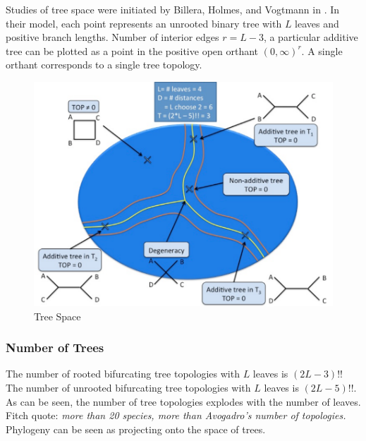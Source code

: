 Studies of tree space were initiated by Billera, Holmes, and Vogtmann in \cite{Billera:2001tv}.
In their model, each point represents an unrooted binary tree with $L$ leaves and positive branch lengths.
Number of interior edges $r=L-3$, a particular additive tree can be plotted as a point in the positive open orthant $(0,\infty)^{r}$.
A single orthant corresponds to a single tree topology.

\begin{figure}
\centering
\includegraphics[]{./fig/TreeSpace.pdf}
\caption{Tree Space}
\label{background:fig:TreeSpace}
\end{figure}

\subsubsection{Number of Trees}

The number of rooted bifurcating tree topologies with $L$ leaves is $(2L-3)!!$
The number of unrooted bifurcating tree topologies with $L$ leaves is $(2L-5)!!$.
As can be seen, the number of tree topologies explodes with the number of leaves.
Fitch quote: \emph{more than 20 species, more than Avogadro's number of topologies.}
Phylogeny can be seen as projecting onto the space of trees.


